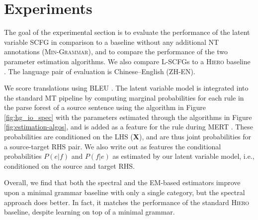 \documentclass[11pt]{article}
\newcommand{\bX}{{\bf X}}
\newcommand{\shaycomment}[1]{\textcolor{blue}{#1 -- Shay}}
\begin{document}
\section{Experiments}
\label{sec:evaluation}
The goal of the experimental section is to evaluate the performance of the latent variable SCFG in comparison to a baseline without any additional NT annotations (\textsc{Min-Grammar}), and to compare the performance of the two parameter estimation algorithms.
We also compare L-SCFGs to a \textsc{Hiero} baseline \cite{Chiang2007}. 
The language pair of evaluation is Chinese--English (\textsc{ZH-EN}).  

We score translations using BLEU \cite{Papineni2002}.  
The latent variable model is integrated into the standard MT pipeline by computing marginal probabilities for each rule in the parse forest of a source sentence using the algorithm in Figure \ref{fig:hg_io_spec} with the parameters estimated through the algorithms in Figure \ref{fig:estimation-algos}, and is added as a feature for the rule during MERT \cite{Och2003}.  
These probabilities are conditioned on the LHS (\bX), and are thus joint probabilities for a source-target RHS pair.  
We also write out as features the conditional probabilities $P(e|f)$ and $P(f|e)$ as estimated by our latent variable model, i.e., conditioned on the source and target RHS.  

Overall, we find that both the spectral and the EM-based estimators improve upon a minimal grammar baseline with only a single category, but the spectral approach does better. 
In fact, it matches the performance of the standard \textsc{Hiero} baseline, despite learning on top of a minimal grammar.  
\end{document}
